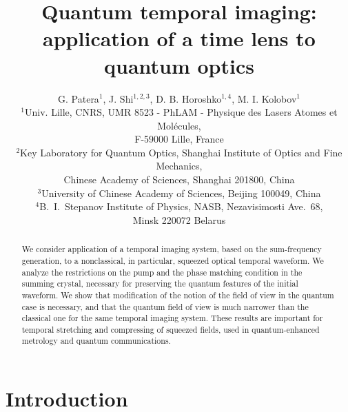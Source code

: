 \documentclass[10pt,twocolumn]{article}
\begin{document}
\title{Quantum temporal imaging: application of a time lens to quantum optics}

\author{G. Patera$^1$, J. Shi$^{1,2,3}$, D. B. Horoshko$^{1,4}$, M. I. Kolobov$^1$\vspace{10pt}\\
$^1$Univ. Lille, CNRS, UMR 8523 - PhLAM - Physique des Lasers Atomes et Mol\'{e}cules, \\F-59000 Lille, France\\
$^2$Key Laboratory for Quantum Optics, Shanghai Institute of Optics and Fine Mechanics, \\Chinese Academy of Sciences, Shanghai 201800, China\\
$^3$University of Chinese Academy of Sciences, Beijing 100049, China\\
$^4$B.~I.~Stepanov Institute of Physics, NASB, Nezavisimosti Ave.~68, \\Minsk 220072 Belarus}

\maketitle

\begin{abstract}
We consider application of a temporal imaging system, based on the sum-frequency generation, to a nonclassical, in particular, squeezed optical temporal waveform. We analyze the restrictions on the pump and the phase matching condition in the summing crystal, necessary for preserving the quantum features of the initial waveform. We show that modification of the notion of the field of view in the quantum case is necessary, and that the quantum field of view is much narrower than the classical one for the same temporal imaging system. These results are important for temporal stretching and compressing of squeezed fields, used in quantum-enhanced metrology and quantum communications.
\end{abstract}


\section{Introduction}
\end{document}
